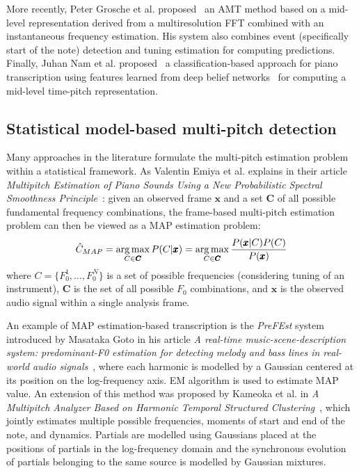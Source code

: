 More recently, Peter Grosche et al. proposed~\cite{grosche2012automatic} an \ac{AMT} method based on a mid-level
representation derived from a multiresolution \ac{FFT} combined with an instantaneous frequency estimation. His system
also combines event (specifically start of the note) detection and tuning estimation for computing predictions. Finally,
Juhan Nam et al. proposed~\cite{nam2011classification} a classification-based approach for piano transcription using
features learned from deep belief networks~\cite{humphrey2013feature} for computing a mid-level time-pitch representation.

\subsection{Statistical model-based multi-pitch detection}\label{subsec:statistical-model-based-multi-pitch-detection}
Many approaches in the literature formulate the multi-pitch estimation problem within a statistical framework. As
Valentin Emiya et al. explains in their article \textit{Multipitch Estimation of Piano Sounds Using a New Probabilistic
Spectral Smoothness Principle}~\cite{proba-spectral-smoothness}: given an observed frame $\pmb{x}$ and a set $\pmb{C}$ of
all possible fundamental frequency combinations, the frame-based multi-pitch estimation problem can then be viewed as
a \ac{MAP} estimation problem:
\[ \hat{C}_{MAP} = \operatorname*{arg\,max}_{C \in \pmb{C}} P(C|\pmb{x}) = \operatorname*{arg\,max}_{C \in \pmb{C}} \frac{P(\pmb{x}|C)P(C)}{P(\pmb{x})} \]
where $C = \{F_0^1, \dots, F_0^N\}$ is a set of possible frequencies (considering tuning of an instrument), $\pmb{C}$ is
the set of all possible $F_0$ combinations, and $\pmb{x}$ is the observed audio signal within a single analysis frame.

An example of \ac{MAP} estimation-based transcription is the \textit{PreFEst} system introduced by Masataka Goto in his
article \textit{A real-time music-scene-description system: predominant-F0 estimation for detecting melody and bass
lines in real-world audio signals}~\cite{predominant-f0-estimation}, where each harmonic is modelled by a Gaussian
centered at its position on the log-frequency axis. \ac{EM} algorithm is used to estimate \ac{MAP} value.
An extension of this method was proposed by Kameoka et al. in \textit{A Multipitch Analyzer Based on Harmonic Temporal
Structured Clustering}~\cite{harmonic-temporal-structured-clustering}, which jointly estimates multiple possible
frequencies, moments of start and end of the note, and dynamics. Partials are modelled using Gaussians placed at
the positions of partials in the log-frequency domain and the synchronous evolution of partials belonging to the same
source is modelled by Gaussian mixtures.

